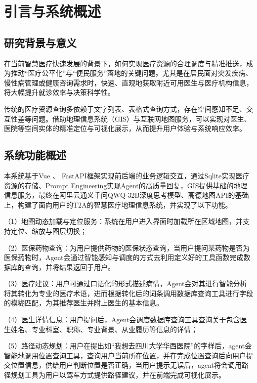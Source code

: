 \documentclass[fleqn,10pt]{IntroToAI} %
\affiliation{\textsuperscript{1}\textit{西南石油大学}} %
\affiliation{\textsuperscript{2}\textit{地球科学与技术学院}} %
\affiliation{\textsuperscript{3}\textit{地质工程专业，202422000023}} %
\affiliation{*\textbf{通讯作者}: qianxi111@126.com} %
\begin{document}
\renewcommand{\figurename}{图} 	
\renewcommand{\tablename}{表} 		
\flushbottom 
\maketitle 

\section{引言与系统概述} 

\subsection{研究背景与意义}

在当前智慧医疗快速发展的背景下，如何实现医疗资源的合理调度与精准推送，成为推动“医疗公平化”与“便民服务”落地的关键问题。尤其是在居民面对突发疾病、慢性病管理或健康咨询需求时，快速、直观地获取附近可用医生与医疗机构信息，将大幅提升就诊效率与决策科学性。

传统的医疗资源查询多依赖于文字列表、表格式查询方式，存在空间感知不足、交互性差等问题。借助地理信息系统（GIS）与互联网地图服务，可以实现对医生、医院等空间实体的精准定位与可视化展示，从而提升用户体验与系统响应效率。

\subsection{系统功能概述}
本系统基于Vue 、 FastAPI框架实现前后端的业务逻辑交互，通过Sqlite实现医疗资源的存储、Prompt Engineering实现Agent的高质量回复，GIS提供基础的地理信息服务，最终在阿里云通义千问QWQ-32B深度思考模型、高德地图API的基础上，构建了面向用户的T2A的智慧医疗地理信息系统，并实现了以下功能。

（1）地图动态加载与定位服务：系统在用户进入界面时加载所在区域地图，并支持定位、缩放与图层切换；

（2）医保药物查询：为用户提供药物的医保状态查询，当用户提问某药物是否为医保药物时，Agent会通过智能感知与调度的方式去利用定义好的工具函数完成数据库的查询，并将结果返回于用户。

（3）医疗建议：用户可通过口语化的形式描述病情，Agent会对其进行智能分析将其转化为专业的医疗术语，进而根据转化后的词条调用数据库查询工具进行字段的模糊匹配，为其推荐医生并附上医生的基本信息。

（4）医生详情信息：用户提问后，Agent会调度数据库查询工具查询关于包含医生姓名、专业科室、职称、专业背景、从业履历等信息的详情；

（5）路径动态规划：用户在提出如“我想去四川大学华西医院”的字样后，agent会智能地调用位置查询工具，查询用户当前所在位置，并在完成位置查询后向用户提交位置信息，供给用户判断位置是否正确，当用户提示无误后，agent将会调用路径规划工具为用户以驾车方式提供路径建议，并在前端完成可视化展示。
\end{document}
